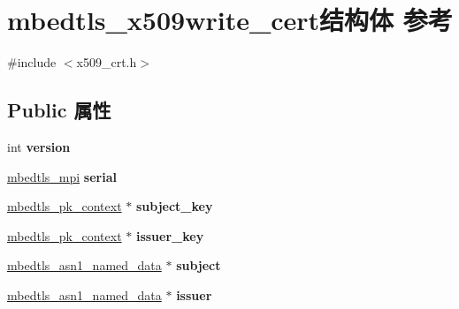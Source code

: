 \hypertarget{structmbedtls__x509write__cert}{}\section{mbedtls\+\_\+x509write\+\_\+cert结构体 参考}
\label{structmbedtls__x509write__cert}


{\ttfamily \#include $<$x509\+\_\+crt.\+h$>$}

\subsection*{Public 属性}
\begin{DoxyCompactItemize}
\item 
\mbox{\label{structmbedtls__x509write__cert_a9efd79e9e5e9228c957728db5d03a459}} 
int {\bfseries version}
\item 
\mbox{\label{structmbedtls__x509write__cert_ab7ff135f8e06151a37ad6f1a10ffac53}} 
\hyperlink{structmbedtls__mpi}{mbedtls\+\_\+mpi} {\bfseries serial}
\item 
\mbox{\label{structmbedtls__x509write__cert_ac340701cdf2c579031ee2a50116caccb}} 
\hyperlink{structmbedtls__pk__context}{mbedtls\+\_\+pk\+\_\+context} $\ast$ {\bfseries subject\+\_\+key}
\item 
\mbox{\label{structmbedtls__x509write__cert_a50ab1cded78af00e04dc3541f8855f6e}} 
\hyperlink{structmbedtls__pk__context}{mbedtls\+\_\+pk\+\_\+context} $\ast$ {\bfseries issuer\+\_\+key}
\item 
\mbox{\label{structmbedtls__x509write__cert_a952c4123df451d97b328cc5e4064b4e2}} 
\hyperlink{structmbedtls__asn1__named__data}{mbedtls\+\_\+asn1\+\_\+named\+\_\+data} $\ast$ {\bfseries subject}
\item 
\mbox{\label{structmbedtls__x509write__cert_a6c66901676851921daa39a7cd194b39b}} 
\hyperlink{structmbedtls__asn1__named__data}{mbedtls\+\_\+asn1\+\_\+named\+\_\+data} $\ast$ {\bfseries issuer}
\item 
\mbox{\label{structmbedtls__x509write__cert_a2f6f4b15724665cb69f09721a6993a14}} 

\end{DoxyCompactItemize}
